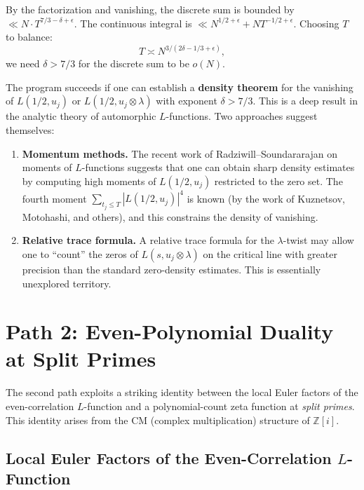 \documentclass[11pt,a4paper]{article}
\theoremstyle{plain}
\theoremstyle{definition}
\newcommand{\ZZ}{\mathbb{Z}}
\begin{document}
By the factorization and vanishing, the discrete sum is bounded by $\ll N \cdot T^{7/3 - \delta + \epsilon}$. The continuous integral is $\ll N^{1/2+\epsilon} + N T^{-1/2+\epsilon}$. Choosing $T$ to balance:
\[
T \asymp N^{3/(2\delta - 1/3 + \epsilon)},
\]
we need $\delta > 7/3$ for the discrete sum to be $o(N)$.

\begin{strategy}
The program succeeds if one can establish a \textbf{density theorem} for the vanishing of $L(1/2, u_j)$ or $L(1/2, u_j \otimes \lambda)$ with exponent $\delta > 7/3$. This is a deep result in the analytic theory of automorphic $L$-functions. Two approaches suggest themselves:

\begin{enumerate}
\item \textbf{Momentum methods.} The recent work of Radziwill--Soundararajan on moments of $L$-functions suggests that one can obtain sharp density estimates by computing high moments of $L(1/2, u_j)$ restricted to the zero set. The fourth moment $\sum_{t_j \leq T} |L(1/2, u_j)|^4$ is known (by the work of Kuznetsov, Motohashi, and others), and this constrains the density of vanishing.

\item \textbf{Relative trace formula.} A relative trace formula for the $\lambda$-twist may allow one to ``count'' the zeros of $L(s, u_j \otimes \lambda)$ on the critical line with greater precision than the standard zero-density estimates. This is essentially unexplored territory.
\end{enumerate}
\end{strategy}


\section{Path 2: Even-Polynomial Duality at Split Primes}
\label{sec:path2}

The second path exploits a striking identity between the local Euler factors of the even-correlation $L$-function and a polynomial-count zeta function at \emph{split primes}.  This identity arises from the CM (complex multiplication) structure of $\ZZ[i]$.

\subsection{Local Euler Factors of the Even-Correlation $L$-Function}
\end{document}

